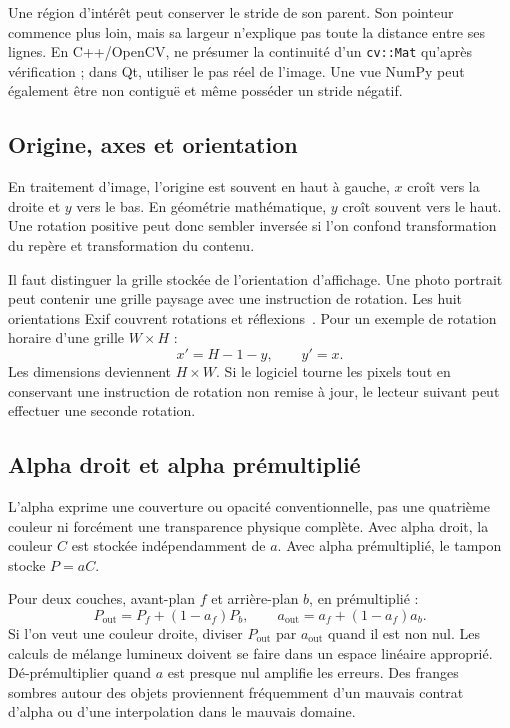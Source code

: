 Une région d'intérêt peut conserver le stride de son parent.
Son pointeur commence plus loin, mais sa largeur n'explique pas
toute la distance entre ses lignes. En C++/OpenCV, ne présumer
la continuité d'un \texttt{cv::Mat} qu'après vérification ; dans Qt,
utiliser le pas réel de l'image. Une vue NumPy peut également être
non contiguë et même posséder un stride négatif.

\subsection{Origine, axes et orientation}
En traitement d'image, l'origine est souvent en haut à gauche,
$x$ croît vers la droite et $y$ vers le bas. En géométrie
mathématique, $y$ croît souvent vers le haut. Une rotation positive
peut donc sembler inversée si l'on confond transformation du repère
et transformation du contenu.

Il faut distinguer la grille stockée de l'orientation d'affichage.
Une photo portrait peut contenir une grille paysage avec une
instruction de rotation. Les huit orientations Exif couvrent
rotations et réflexions~\cite{exif}. Pour un exemple de rotation
horaire d'une grille $W\times H$ :
\[
x'=H-1-y,\qquad y'=x.
\]
Les dimensions deviennent $H\times W$. Si le logiciel tourne les
pixels tout en conservant une instruction de rotation non remise
à jour, le lecteur suivant peut effectuer une seconde rotation.

\subsection{Alpha droit et alpha prémultiplié}
L'alpha exprime une couverture ou opacité conventionnelle, pas une
quatrième couleur ni forcément une transparence physique complète.
Avec alpha droit, la couleur $C$ est stockée indépendamment de $a$.
Avec alpha prémultiplié, le tampon stocke $P=aC$.

Pour deux couches, avant-plan $f$ et arrière-plan $b$, en prémultiplié :
\begin{equation}
P_{\mathrm{out}}=P_f+(1-a_f)P_b,\qquad
a_{\mathrm{out}}=a_f+(1-a_f)a_b.
\end{equation}
Si l'on veut une couleur droite, diviser $P_{\mathrm{out}}$ par
$a_{\mathrm{out}}$ quand il est non nul. Les calculs de mélange
lumineux doivent se faire dans un espace linéaire approprié.
Dé-prémultiplier quand $a$ est presque nul amplifie les erreurs.
Des franges sombres autour des objets proviennent fréquemment
d'un mauvais contrat d'alpha ou d'une interpolation dans le
mauvais domaine.


